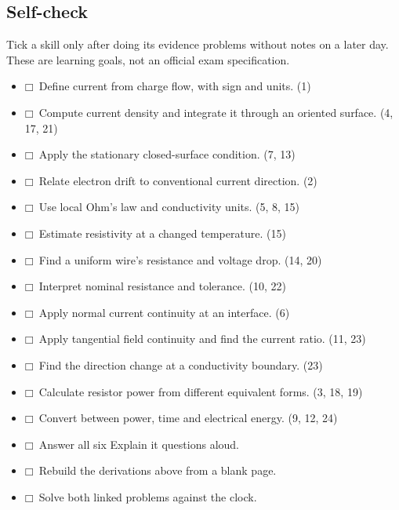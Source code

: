 \documentclass[11pt]{article}
\begin{document}
\begin{keepsection}
\section{Self-check}

Tick a skill only after doing its evidence problems without notes on a later day. These are learning goals, not an official exam specification.

\begin{itemize}[label={}]
\item $\mdlgwhtsquare$\ Define current from charge flow, with sign and units. (1)
\item $\mdlgwhtsquare$\ Compute current density and integrate it through an oriented surface. (4, 17, 21)
\item $\mdlgwhtsquare$\ Apply the stationary closed-surface condition. (7, 13)
\item $\mdlgwhtsquare$\ Relate electron drift to conventional current direction. (2)
\item $\mdlgwhtsquare$\ Use local Ohm’s law and conductivity units. (5, 8, 15)
\item $\mdlgwhtsquare$\ Estimate resistivity at a changed temperature. (15)
\item $\mdlgwhtsquare$\ Find a uniform wire’s resistance and voltage drop. (14, 20)
\item $\mdlgwhtsquare$\ Interpret nominal resistance and tolerance. (10, 22)
\item $\mdlgwhtsquare$\ Apply normal current continuity at an interface. (6)
\item $\mdlgwhtsquare$\ Apply tangential field continuity and find the current ratio. (11, 23)
\item $\mdlgwhtsquare$\ Find the direction change at a conductivity boundary. (23)
\item $\mdlgwhtsquare$\ Calculate resistor power from different equivalent forms. (3, 18, 19)
\item $\mdlgwhtsquare$\ Convert between power, time and electrical energy. (9, 12, 24)
\item $\mdlgwhtsquare$\ Answer all six Explain it questions aloud.
\item $\mdlgwhtsquare$\ Rebuild the derivations above from a blank page.
\item $\mdlgwhtsquare$\ Solve both linked problems against the clock.
\end{itemize}
\end{keepsection}
\end{document}

